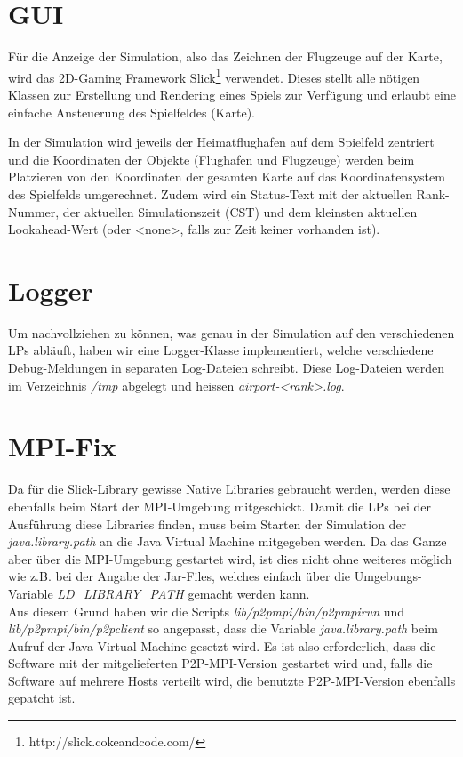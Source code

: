 \documentclass[oneside,DIV12,BCOR0.5cm,bibliography=totoc]{template}
\begin{document}
\begin{empfile}
\section{GUI}

Für die Anzeige der Simulation, also das Zeichnen der Flugzeuge auf der
Karte, wird das 2D-Gaming Framework
Slick\footnote{http://slick.cokeandcode.com/} verwendet. Dieses stellt
alle nötigen Klassen zur Erstellung und Rendering eines Spiels zur
Verfügung und erlaubt eine einfache Ansteuerung des Spielfeldes (Karte).

In der Simulation wird jeweils der Heimatflughafen auf dem Spielfeld
zentriert und die Koordinaten der Objekte (Flughafen und Flugzeuge)
werden beim Platzieren von den Koordinaten der gesamten Karte auf
das Koordinatensystem des Spielfelds umgerechnet. Zudem wird ein 
Status-Text mit der aktuellen Rank-Nummer, der aktuellen
Simulationszeit (CST) und dem kleinsten aktuellen Lookahead-Wert (oder
<none>, falls zur Zeit keiner vorhanden ist). 

\section{Logger}

Um nachvollziehen zu können, was genau in der Simulation auf den
verschiedenen LPs abläuft, haben wir eine Logger-Klasse implementiert,
welche verschiedene Debug-Meldungen in separaten Log-Dateien
schreibt. Diese Log-Dateien werden im Verzeichnis \emph{/tmp} abgelegt
und heissen \emph{airport-<rank>.log}.

\section{MPI-Fix}

Da für die Slick-Library gewisse Native Libraries gebraucht werden,
werden diese ebenfalls beim Start der MPI-Umgebung mitgeschickt. Damit
die LPs bei der Ausführung diese Libraries finden, muss beim Starten
der Simulation der \emph{java.library.path} an die Java Virtual
Machine mitgegeben werden. Da das Ganze aber über die MPI-Umgebung
gestartet wird, ist dies nicht ohne weiteres möglich wie z.B. bei
der Angabe der Jar-Files, welches einfach über die Umgebungs-Variable
\emph{LD\_LIBRARY\_PATH} gemacht werden kann.\\

Aus diesem Grund haben wir die Scripts \emph{lib/p2pmpi/bin/p2pmpirun}
und \emph{lib/p2pmpi/bin/p2pclient} so angepasst, dass die Variable
\emph{java.library.path} beim Aufruf der Java Virtual Machine gesetzt
wird. Es ist also erforderlich, dass die Software mit der mitgelieferten
P2P-MPI-Version gestartet wird und, falls die Software auf mehrere
Hosts verteilt wird, die benutzte P2P-MPI-Version ebenfalls gepatcht
ist.

\end{empfile}
\end{document}
